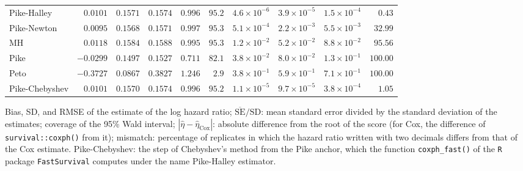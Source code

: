 \begin{landscape}
\begin{longtable}{lrrrrrrrrr}
Pike-Halley & $0.0101$ & $0.1571$ & $0.1574$ & $0.996$ & $95.2$ & $4.6 \times 10^{-6}$ & $3.9 \times 10^{-5}$ & $1.5 \times 10^{-4}$ & $0.43$ \\
Pike-Newton & $0.0095$ & $0.1568$ & $0.1571$ & $0.997$ & $95.3$ & $5.1 \times 10^{-4}$ & $2.2 \times 10^{-3}$ & $5.5 \times 10^{-3}$ & $32.99$ \\
MH & $0.0118$ & $0.1584$ & $0.1588$ & $0.995$ & $95.3$ & $1.2 \times 10^{-2}$ & $5.2 \times 10^{-2}$ & $8.8 \times 10^{-2}$ & $95.56$ \\
Pike & $-0.0299$ & $0.1497$ & $0.1527$ & $0.711$ & $82.1$ & $3.8 \times 10^{-2}$ & $8.0 \times 10^{-2}$ & $1.3 \times 10^{-1}$ & $100.00$ \\
Peto & $-0.3727$ & $0.0867$ & $0.3827$ & $1.246$ & $2.9$ & $3.8 \times 10^{-1}$ & $5.9 \times 10^{-1}$ & $7.1 \times 10^{-1}$ & $100.00$ \\
Pike-Chebyshev & $0.0101$ & $0.1570$ & $0.1574$ & $0.996$ & $95.2$ & $1.1 \times 10^{-5}$ & $9.7 \times 10^{-5}$ & $3.8 \times 10^{-4}$ & $1.05$ \\
\end{longtable}
Bias, SD, and RMSE of the estimate of the log hazard ratio; $\overline{\mathrm{SE}}/\mathrm{SD}$: mean standard error divided by the standard deviation of the estimates; coverage of the 95\% Wald interval; $|\hat{\eta} - \hat{\eta}_{\mathrm{Cox}}|$: absolute difference from the root of the score (for Cox, the difference of \texttt{survival::coxph()} from it); mismatch: percentage of replicates in which the hazard ratio written with two decimals differs from that of the Cox estimate. Pike-Chebyshev: the step of Chebyshev's method from the Pike anchor, which the function \texttt{coxph\_fast()} of the \texttt{R} package \texttt{FastSurvival} computes under the name Pike-Halley estimator.\par
\endgroup
\end{landscape}
